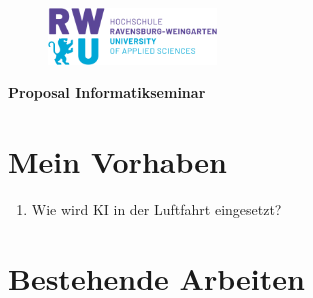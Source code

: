 \documentclass[12pt,a4paper]{article}
\begin{document}
	
	\renewcommand{\familydefault}{\sfdefault}
	\normalfont
	\onehalfspacing
	
	\vspace*{-2.5cm} 
	\begin{figure}[H]%
		\raggedleft \includegraphics[height=1.5cm]{figures/RWU_Logo.png}
		\hfill %
		\end{figure}
	
	{\LARGE\textbf{Proposal Informatikseminar}}\\
	\section{Mein Vorhaben}
	\begin{enumerate}
		\item{Wie wird KI in der Luftfahrt eingesetzt?}
	\end{enumerate}
	\section{Bestehende Arbeiten}
	
\end{document}
